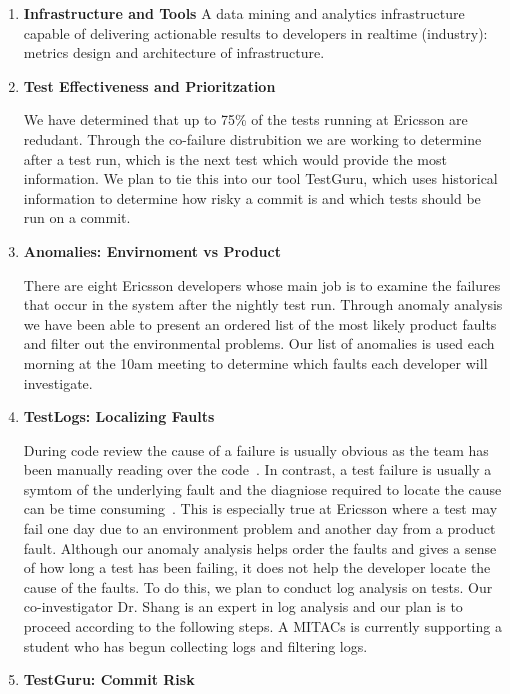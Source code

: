 \documentclass[12pt, letterpaper]{article}
\begin{document}
\begin{enumerate}

\item \textbf{Infrastructure and Tools} A data mining and analytics infrastructure capable of delivering actionable results to developers in realtime (industry): metrics design and architecture of infrastructure.

\item \textbf{Test Effectiveness and Prioritzation} 

We have determined that up to 75\% of the tests running at Ericsson are redudant. Through the co-failure distrubition we are working to determine after a test run, which is the next test which would provide the most information. We plan to tie this into our tool TestGuru, which uses historical information to determine how risky a commit is and which tests should be run on a commit.

\item \textbf{Anomalies: Envirnoment vs Product}

There are eight Ericsson developers whose main job is to examine the failures that occur in the system after the nightly test run. Through anomaly analysis we have been able to present an ordered list of the most likely product faults and filter out the environmental problems. Our list of anomalies is used each morning at the 10am meeting to determine which faults each developer will investigate.

\item \textbf{TestLogs: Localizing Faults}

During code review the cause of a failure is usually obvious as the team has been manually reading over the code~\cite{}. In contrast, a test failure is usually a symtom of the underlying fault and the diagniose required to locate the cause can be time consuming~\cite{}. This is especially true at Ericsson where a test may fail one day due to an environment problem and another day from a product fault. Although our anomaly analysis helps order the faults and gives a sense of how long a test has been failing, it does not help the developer locate the cause of the faults. To do this, we plan to conduct log analysis on tests. Our co-investigator Dr. Shang is an expert in log analysis and our plan is to proceed according to the following steps. A MITACs is currently supporting a student who has begun collecting logs and filtering logs.



\item \textbf{TestGuru: Commit Risk} 


\end{enumerate}
\end{document}
